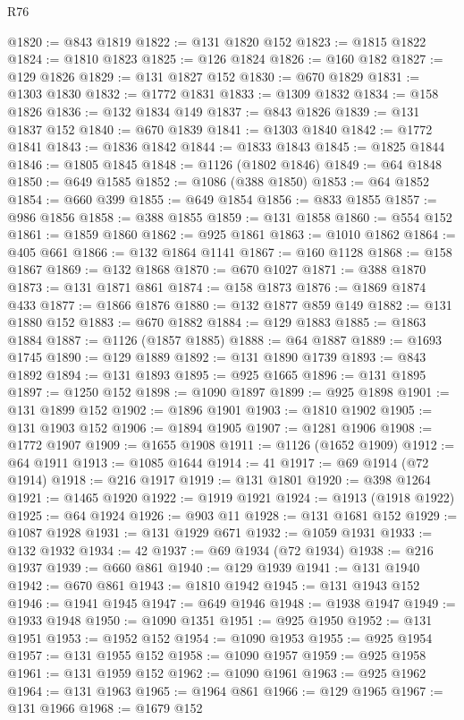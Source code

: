 \begin{lexlean}{R76}
\begin{coremodule}
@1820 := @843 @1819
@1822 := @131 @1820 @152
@1823 := @1815 @1822
@1824 := @1810 @1823
@1825 := @126 @1824
@1826 := @160 @182
@1827 := @129 @1826
@1829 := @131 @1827 @152
@1830 := @670 @1829
@1831 := @1303 @1830
@1832 := @1772 @1831
@1833 := @1309 @1832
@1834 := @158 @1826
@1836 := @132 @1834 @149
@1837 := @843 @1826
@1839 := @131 @1837 @152
@1840 := @670 @1839
@1841 := @1303 @1840
@1842 := @1772 @1841
@1843 := @1836 @1842
@1844 := @1833 @1843
@1845 := @1825 @1844
@1846 := @1805 @1845
@1848 := @1126 (@1802 @1846)
@1849 := @64 @1848
@1850 := @649 @1585
@1852 := @1086 (@388 @1850)
@1853 := @64 @1852
@1854 := @660 @399
@1855 := @649 @1854
@1856 := @833 @1855
@1857 := @986 @1856
@1858 := @388 @1855
@1859 := @131 @1858
@1860 := @554 @152
@1861 := @1859 @1860
@1862 := @925 @1861
@1863 := @1010 @1862
@1864 := @405 @661
@1866 := @132 @1864 @1141
@1867 := @160 @1128
@1868 := @158 @1867
@1869 := @132 @1868
@1870 := @670 @1027
@1871 := @388 @1870
@1873 := @131 @1871 @861
@1874 := @158 @1873
@1876 := @1869 @1874 @433
@1877 := @1866 @1876
@1880 := @132 @1877 @859 @149
@1882 := @131 @1880 @152
@1883 := @670 @1882
@1884 := @129 @1883
@1885 := @1863 @1884
@1887 := @1126 (@1857 @1885)
@1888 := @64 @1887
@1889 := @1693 @1745
@1890 := @129 @1889
@1892 := @131 @1890 @1739
@1893 := @843 @1892
@1894 := @131 @1893
@1895 := @925 @1665
@1896 := @131 @1895
@1897 := @1250 @152
@1898 := @1090 @1897
@1899 := @925 @1898
@1901 := @131 @1899 @152
@1902 := @1896 @1901
@1903 := @1810 @1902
@1905 := @131 @1903 @152
@1906 := @1894 @1905
@1907 := @1281 @1906
@1908 := @1772 @1907
@1909 := @1655 @1908
@1911 := @1126 (@1652 @1909)
@1912 := @64 @1911
@1913 := @1085 @1644
@1914 := 41
@1917 := @69 @1914 (@72 @1914)
@1918 := @216 @1917
@1919 := @131 @1801
@1920 := @398 @1264
@1921 := @1465 @1920
@1922 := @1919 @1921
@1924 := @1913 (@1918 @1922)
@1925 := @64 @1924
@1926 := @903 @11
@1928 := @131 @1681 @152
@1929 := @1087 @1928
@1931 := @131 @1929 @671
@1932 := @1059 @1931
@1933 := @132 @1932
@1934 := 42
@1937 := @69 @1934 (@72 @1934)
@1938 := @216 @1937
@1939 := @660 @861
@1940 := @129 @1939
@1941 := @131 @1940
@1942 := @670 @861
@1943 := @1810 @1942
@1945 := @131 @1943 @152
@1946 := @1941 @1945
@1947 := @649 @1946
@1948 := @1938 @1947
@1949 := @1933 @1948
@1950 := @1090 @1351
@1951 := @925 @1950
@1952 := @131 @1951
@1953 := @1952 @152
@1954 := @1090 @1953
@1955 := @925 @1954
@1957 := @131 @1955 @152
@1958 := @1090 @1957
@1959 := @925 @1958
@1961 := @131 @1959 @152
@1962 := @1090 @1961
@1963 := @925 @1962
@1964 := @131 @1963
@1965 := @1964 @861
@1966 := @129 @1965
@1967 := @131 @1966
@1968 := @1679 @152

\end{coremodule}
\end{lexlean}

